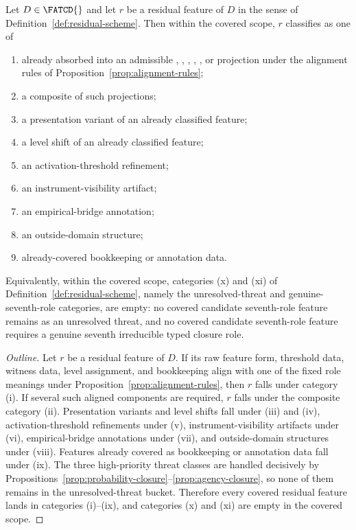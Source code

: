 \begin{theorem}\label{thm:upper-bound-classification}
Let \(D \in \FATCD{}\) and let \(r\) be a residual feature of \(D\) in the
sense of Definition~\ref{def:residual-scheme}. Then within the covered
scope, \(r\) classifies as one of
\begin{enumerate}[label=(\roman*),topsep=2pt,itemsep=1pt]
  \item already absorbed into an admissible \Pone{}, \Ptwo{}, \Pthree{},
    \Pfour{}, \Pfive{}, or \Psix{} projection under the alignment rules of
    Proposition~\ref{prop:alignment-rules};
  \item a composite of such projections;
  \item a presentation variant of an already classified feature;
  \item a level shift of an already classified feature;
  \item an activation-threshold refinement;
  \item an instrument-visibility artifact;
  \item an empirical-bridge annotation;
  \item an outside-domain structure;
  \item already-covered bookkeeping or annotation data.
\end{enumerate}
Equivalently, within the covered scope, categories (x) and (xi) of
Definition~\ref{def:residual-scheme}, namely the unresolved-threat and
genuine-seventh-role categories, are empty: no covered candidate
seventh-role feature remains as an unresolved threat, and no covered
candidate seventh-role feature requires a genuine seventh irreducible
typed closure role.
\end{theorem}

\begin{proof}[Outline]
Let \(r\) be a residual feature of \(D\). If its raw feature form,
threshold data, witness data, level assignment, and bookkeeping align
with one of the fixed role meanings under
Proposition~\ref{prop:alignment-rules}, then \(r\) falls under category
(i). If several such aligned components are required, \(r\) falls under
the composite category (ii). Presentation variants and level shifts fall
under (iii) and (iv), activation-threshold refinements under (v),
instrument-visibility artifacts under (vi), empirical-bridge annotations
under (vii), and outside-domain structures under (viii). Features already
covered as bookkeeping or annotation data fall under (ix). The three
high-priority threat classes are handled decisively by
Propositions~\ref{prop:probability-closure}--\ref{prop:agency-closure},
so none of them remains in the unresolved-threat bucket. Therefore every
covered residual feature lands in categories (i)--(ix), and categories
(x) and (xi) are empty in the covered scope.
\end{proof}

